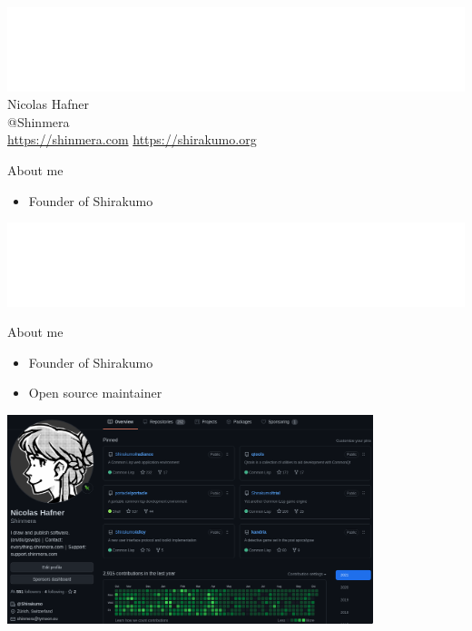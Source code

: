 \documentclass[14pt,t,aspectratio=169]{beamer}
\renewcommand{\title}[1]{
  {\huge #1} \vskip 0.4cm
}
\begin{document}
\begin{frame}
  \begin{center}
    \includegraphics[width=\textwidth]{logo.png}\\
    \vspace{0.2cm}
    {\LARGE Nicolas Hafner} \\
    \vspace{0.2cm}
    {\Large @Shinmera} \\
    \vspace{0.2cm}
    \url{https://shinmera.com}
    \url{https://shirakumo.org}
  \end{center}
\end{frame}

\begin{frame}
  \title{About me}
  \begin{itemize}
  \item Founder of Shirakumo
  \end{itemize}
  \vfill
  \includegraphics[width=\textwidth]{logo.png}
\end{frame}

\begin{frame}
  \title{About me}
  \begin{itemize}
  \item Founder of Shirakumo
  \item Open source maintainer
  \end{itemize}
  \vfill
  \centering
  \includegraphics[width=0.8\textwidth]{github.png}
\end{frame}
\end{document}
